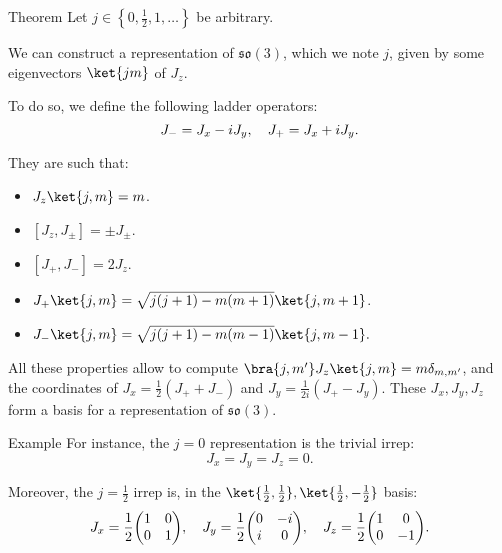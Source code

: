 \documentclass[a4paper]{article}
\begin{document}
\begin{parag}{Theorem}
    Let $j \in \left\{0, \frac{1}{2}, 1, \ldots\right\}$ be arbitrary.

    We can construct a representation of $\mathfrak{so}\left(3\right)$, which we note $j$, given by some eigenvectors $\ket{j m}$ of $J_z$. 

    To do so, we define the following ladder operators: 
    \[J_- = J_x - i J_y, \quad J_+ = J_x + i J_y.\]
    
    They are such that:
    \begin{itemize}
        \item $J_z \ket{j, m} = m$.
        \item $\left[J_z, J_{\pm}\right] = \pm J_{\pm}.$
        \item $\left[J_+, J_-\right] = 2J_z$.
        \item $J_+ \ket{j, m} = \sqrt{j\left(j+1\right) - m\left(m+1\right)} \ket{j, m+1}$.
        \item $J_- \ket{j, m} = \sqrt{j\left(j+1\right) - m\left(m-1\right)} \ket{j, m-1}.$
    \end{itemize}
    
    All these properties allow to compute $\bra{j, m'} J_z \ket{j, m} = m \delta_{m, m'}$, and the coordinates of $J_x = \frac{1}{2}\left(J_+ + J_-\right)$ and $J_y = \frac{1}{2i}\left(J_+ - J_y\right)$. These $J_x, J_y, J_z$ form a basis for a representation of $\mathfrak{so}\left(3\right)$.

    \begin{subparag}{Example}
        For instance, the $j= 0$ representation is the trivial irrep: 
        \[J_x = J_y = J_z = 0.\]

        Moreover, the $j = \frac{1}{2}$ irrep is, in the $\ket{\frac{1}{2}, \frac{1}{2}}, \ket{\frac{1}{2}, -\frac{1}{2}}$ basis: 
        \[J_x = \frac{1}{2} \begin{pmatrix} 1 & 0 \\ 0 & 1 \end{pmatrix}, \mathspace J_y = \frac{1}{2}\begin{pmatrix} 0 & -i \\ i & 0 \end{pmatrix}, \mathspace J_z = \frac{1}{2} \begin{pmatrix} 1 & 0 \\ 0 & -1 \end{pmatrix}.\]


\end{subparag}
\end{parag}
\end{document}
